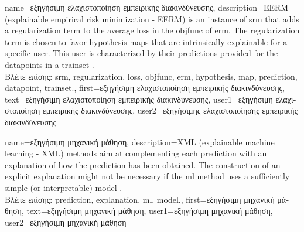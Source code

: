{name={\foreignlanguage{greek}{εξηγήσιμη ελαχιστοποίηση εμπειρικής διακινδύνευσης}}, 
	description={EERM (explainable empirical risk minimization - EERM) is 
		an 
		instance of \gls{srm} that adds a \gls{regularization} term to the average \gls{loss} in the \gls{objfunc} of \gls{erm}. 
		The \gls{regularization} term is chosen to favor \gls{hypothesis} \gls{map}s that are intrinsically 
		explainable for a specific user. This user is characterized by their \gls{prediction}s provided 
		for the \gls{datapoint}s in a \gls{trainset} \cite{Zhang:2024aa}.\\
		\foreignlanguage{greek}{Βλέπε επίσης:} \gls{srm}, \gls{regularization}, \gls{loss}, \gls{objfunc}, \gls{erm}, \gls{hypothesis}, 
		\gls{map}, \gls{prediction}, \gls{datapoint}, \gls{trainset}.},
	first={\foreignlanguage{greek}{εξηγήσιμη ελαχιστοποίηση εμπειρικής διακινδύνευσης}}, 
	text={\foreignlanguage{greek}{εξηγήσιμη ελαχιστοποίηση εμπειρικής διακινδύνευσης}},
	user1={\foreignlanguage{greek}{εξηγήσιμη ελαχιστοποίηση εμπειρικής διακινδύνευσης}}, %
  	user2={\foreignlanguage{greek}{εξηγήσιμης ελαχιστοποίησης εμπειρικής διακινδύνευσης}} %
}

{name={\foreignlanguage{greek}{εξηγήσιμη μηχανική μάθηση}}, 
	description={XML (explainable machine learning - XML)
		methods aim at complementing each \gls{prediction} with an \gls{explanation} of 
		how the \gls{prediction} has been obtained. The construction of an explicit \gls{explanation} 
		might not be necessary if the \gls{ml} method uses a sufficiently simple (or interpretable) \gls{model} \cite{rudin2019stop}.\\
		\foreignlanguage{greek}{Βλέπε επίσης:} \gls{prediction}, \gls{explanation}, \gls{ml}, \gls{model}.},
	first={\foreignlanguage{greek}{εξηγήσιμη μηχανική μάθηση}},
	text={\foreignlanguage{greek}{εξηγήσιμη μηχανική μάθηση}},
	user1={\foreignlanguage{greek}{εξηγήσιμη μηχανική μάθηση}}, %
  	user2={\foreignlanguage{greek}{εξηγήσιμη μηχανική μάθηση}} %
}


